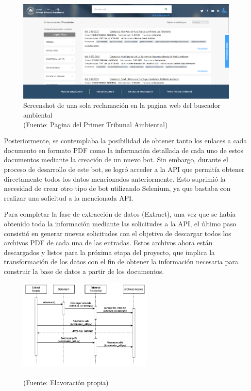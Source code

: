 \begin{figure}[ht!]
    \centering
    \includegraphics[width=.8\textwidth]{figures/huemul2.png}
    \caption[Screenshot de una sola reclamación en la pagina web del buscador ambiental]{Screenshot de una sola reclamación en la pagina web del buscador ambiental\\
    {\scriptsize (Fuente: Pagina del Primer Tribunal Ambiental)}}
    \label{fig:extract2}
\end{figure}
    
Posteriormente, se contemplaba la posibilidad de obtener tanto los enlaces a cada documento en formato PDF como la información 
detallada de cada uno de estos documentos mediante la creación de un nuevo bot. Sin embargo, durante el proceso de desarrollo 
de este bot, se logró acceder a la API que permitía obtener directamente todos los datos mencionados anteriormente. Esto suprimió 
la necesidad de crear otro tipo de bot utilizando Selenium, ya que bastaba con realizar una solicitud a la mencionada API.

Para completar la fase de extracción de datos (Extract), una vez que se había obtenido toda la información mediante las solicitudes 
a la API, el último paso consistió en generar nuevas solicitudes con el objetivo de descargar todos los archivos PDF de cada una 
de las entradas. Estos archivos ahora están descargados y listos para la próxima etapa del proyecto, que implica la transformación 
de los datos con el fin de obtener la información necesaria para construir la base de datos a partir de los documentos.

\begin{figure}[ht!]
    \centering
    \includegraphics[width=0.6\textwidth]{figures/extract_diagram.png}
    \caption[]{\\
    {\scriptsize (Fuente: Elavoración propia)}}
    \label{fig:chatbot1}
\end{figure}



